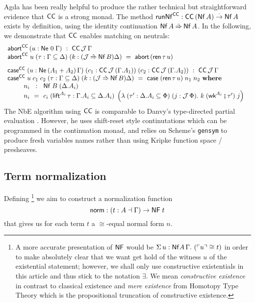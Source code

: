\documentclass[a4paper,USenglish,cleveref, autoref]{lipics-v2019}
\begin{document}
Agda has been really helpful to produce the rather technical but
straightforward evidence that $\CC$ is a strong monad.
The method $\trunNf[\CC] : \CC\,(\tNf\,A) \todot \tNf\,A$
exists by definition, using the identity continuation $\tNf\,A \hatto \tNf\,A$.
In the following, we demonstrate that $\CC$
enables matching on neutrals:
\[
\begin{array}{l}
  \tabort^{\CC} \, (u : \Ne \tyzero \Gamma) ~:~  \CC\,\J\,\Gamma \\
  \tabort^{\CC}
    \; u
    \; (\tau : \Gamma \sublist \Delta)
    \; (k : (\J \hatto \tNf\,B)\Delta)
     ~=~
    \tabort\,(\tren\,\tau\,u)
\\[2ex]
  \tcase^{\CC}
     \; (u : \NeP {A_1 + A_2} \Gamma)
     \; (c_1 : \CC\,\J\,(\cext \Gamma {A_1}))
     \; (c_2 : \CC\,\J\,(\cext \Gamma {A_2}))
    ~:~ \CC\,\J\,\Gamma \\
  \tcase^{\CC}
    \; u
    \; c_1
    \; c_2
    \; (\tau : \Gamma \sublist \Delta)
    \; (k : (\J \hatto \tNf\,B)\Delta)
     ~=~
    \tcase\;(\tren\,\tau\,u)\;n_1\;n_2
    \bwhere \\
\qquad
  \begin{array}{l@{~~}c@{~~}l}
     n_i & : & \Nf B {(\cext \Delta {A_i})} \\
     n_i & = & c_i
      \; (\tlift^{A_i}\,\tau
            : \cext \Gamma {A_i} \sublist \cext \Delta {A_i})
      \; \left(\lambda
            \; (\tau' : \cext \Delta {A_i} \sublist \Phi)
            \; (j :  \J\,\Phi) .
            \ k
            \; (\twk^{A_i} \rcomp \tau')
            \; j
         \right)
  \end{array}
\end{array}
\]
The NbE algorithm using $\CC$ is comparable to Danvy's type-directed
partial evaluation \cite[Figure~8]{danvy:popl96}.  However, he uses
shift-reset style continutations which can be programmed in the
continuation monad, and relies on Scheme's \texttt{gensym} to produce
fresh variables names rather than using Kripke function space / presheaves.


\subsection{Term normalization}

Defining%
\footnote{%
A more accurate presentation of $\tNF$ would be
$\Sigma\,{u : \tNf A\,\Gamma}.\ (\tm u \cong t)$
in order to make absolutely clear that we
want get hold of the witness $u$ of the existential statement;
however, we shall only use constructive
existentials
in this article and thus stick to the notation $\exists$.
We mean \emph{constructive existence} in
  contrast to classical existence and
  \emph{mere existence} from Homotopy Type Theory which
  is the propositional truncation of constructive existence.
}
we aim to construct a normalization function
\[
  \tnorm : (t : A \from \Gamma) \to \NF t
\]
that gives us for each term $t$ a $\cong$-equal normal form $n$.
\end{document}
